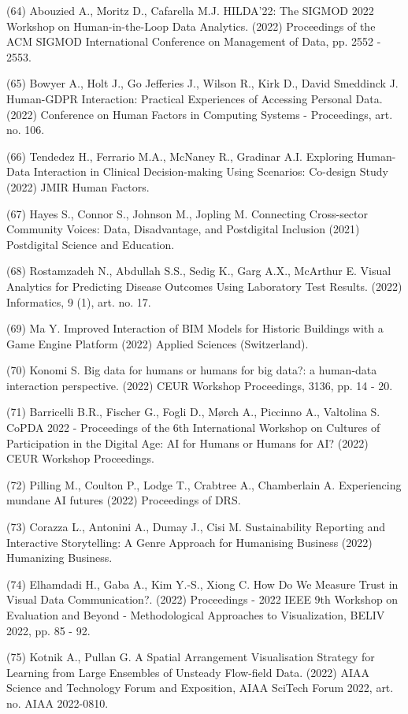 \documentclass[
	12pt,				%
	oneside,			%
	a4paper,			%
	english,			%
	brazil				%
	]{abntex2ppgsi}
\begin{document}
\begin{apendicesenv}
(64) Abouzied A., Moritz D., Cafarella M.J. HILDA'22: The SIGMOD 2022 Workshop on Human-in-the-Loop Data Analytics. (2022) Proceedings of the ACM SIGMOD International Conference on Management of Data, pp. 2552 - 2553.


(65) Bowyer A., Holt J., Go Jefferies J., Wilson R., Kirk D., David Smeddinck J. Human-GDPR Interaction: Practical Experiences of Accessing Personal Data. (2022) Conference on Human Factors in Computing Systems - Proceedings, art. no. 106.

(66) Tendedez H., Ferrario M.A., McNaney R., Gradinar A.I. Exploring Human-Data Interaction in Clinical Decision-making Using Scenarios: Co-design Study (2022) JMIR Human Factors.

(67) Hayes S., Connor S., Johnson M., Jopling M. Connecting Cross-sector Community Voices: Data, Disadvantage, and Postdigital Inclusion (2021) Postdigital Science and Education.

(68) Rostamzadeh N., Abdullah S.S., Sedig K., Garg A.X., McArthur E. Visual Analytics for Predicting Disease Outcomes Using Laboratory Test Results. (2022) Informatics, 9 (1), art. no. 17.

(69) Ma Y. Improved Interaction of BIM Models for Historic Buildings with a Game Engine Platform (2022) Applied Sciences (Switzerland).

(70) Konomi S. Big data for humans or humans for big data?: a human-data interaction perspective. (2022) CEUR Workshop Proceedings, 3136, pp. 14 - 20.



(71) Barricelli B.R., Fischer G., Fogli D., Mørch A., Piccinno A., Valtolina S. CoPDA 2022 - Proceedings of the 6th International Workshop on Cultures of Participation in the Digital Age: AI for Humans or Humans for AI? (2022) CEUR Workshop Proceedings.

(72) Pilling M., Coulton P., Lodge T., Crabtree A., Chamberlain A. Experiencing mundane AI futures (2022) Proceedings of DRS.

(73) Corazza L., Antonini A., Dumay J., Cisi M. Sustainability Reporting and Interactive Storytelling: A Genre Approach for Humanising Business (2022) Humanizing Business.

(74) Elhamdadi H., Gaba A., Kim Y.-S., Xiong C. How Do We Measure Trust in Visual Data Communication?. (2022) Proceedings - 2022 IEEE 9th Workshop on Evaluation and Beyond - Methodological Approaches to Visualization, BELIV 2022, pp. 85 - 92.


(75) Kotnik A., Pullan G. A Spatial Arrangement Visualisation Strategy for Learning from Large Ensembles of Unsteady Flow-field Data. (2022) AIAA Science and Technology Forum and Exposition, AIAA SciTech Forum 2022, art. no. AIAA 2022-0810.


\end{apendicesenv}
\end{document}
